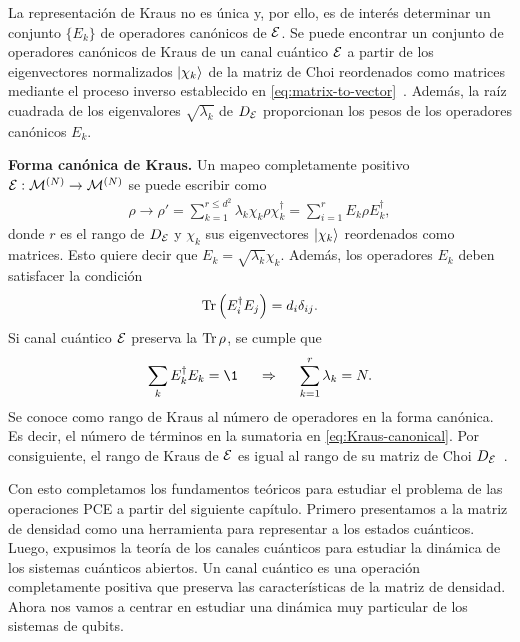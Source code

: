 La representación de Kraus no es única y, por ello, es de interés
determinar un conjunto $\{E_k\}$ de operadores canónicos de $\mathcal{E}$.
Se puede encontrar un conjunto de operadores canónicos de Kraus de 
un canal cuántico $\mathcal{E}$ a partir de los eigenvectores normalizados 
$\ket{\chi_k}$ de la matriz de Choi reordenados como matrices 
mediante el proceso inverso
establecido en \eqref{eq:matrix-to-vector}~\cite{bengtsson_zyczkowski_2017}.
Además, la raíz cuadrada de los eigenvalores $\sqrt{\lambda_k}$ de 
$D_{\mathcal{E}}$ proporcionan los pesos de los operadores canónicos $E_k$.

\textbf{Forma canónica de Kraus.} Un mapeo completamente 
positivo $\mathcal{E}:\mathcal{M}^{(N)}\to\mathcal{M}^{(N)}$ se
puede escribir como
\begin{align}
\rho \longrightarrow \rho' = 
\sum_{k=1}^{r\leq d^2}\lambda_k\chi_k\rho\chi_k^{\dagger}
= \sum_{i=1}^rE_k\rho E_k^{\dagger},
\label{eq:Kraus-canonical}
\end{align}
donde $r$ es el rango de $D_{\mathcal{E}}$ y $\chi_k$ sus eigenvectores
$\ket{\chi_k}$ reordenados como matrices. Esto quiere decir que 
$E_k=\sqrt{\lambda_k}\chi_k$. Además, los 
operadores $E_k$ deben satisfacer la condición
\begin{align}
  \Tr\qty(E_i^{\dagger}E_j)=d_i\delta_{ij}.
  \label{eq:Tr-Kraus-canonical}
\end{align}
Si canal cuántico $\mathcal{E}$ preserva la $\Tr \rho$, se cumple que
\begin{align}
  \sum_kE_k^{\dagger}E_k=\1
  \hspace{0.5cm}\Rightarrow\hspace{0.5cm}
  \sum_{k=1}^r\lambda_k=N .
  \label{eq:completeness-Kraus-canonical}
\end{align}
Se conoce como rango de Kraus al número de operadores 
en la forma canónica. Es decir, el número de términos en la sumatoria
en \eqref{eq:Kraus-canonical}. Por consiguiente, el rango de 
Kraus de $\mathcal{E}$ es igual al rango de su matriz de Choi 
$D_{\mathcal{E}}$~\cite{bengtsson_zyczkowski_2017}.

Con esto completamos los fundamentos teóricos para estudiar 
el problema de las operaciones PCE a partir del siguiente capítulo. 
Primero presentamos a la matriz de densidad como una herramienta 
para representar a los estados cuánticos. Luego, expusimos la teoría 
de los canales cuánticos para estudiar la dinámica de los sistemas 
cuánticos abiertos. Un canal cuántico es una operación
completamente positiva que preserva las características de la 
matriz de densidad. Ahora nos vamos a centrar en estudiar una 
dinámica muy particular de los sistemas de qubits.


